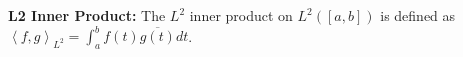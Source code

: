 {\bf L2 Inner Product:} The $L^2$ inner product on $L^2([a,b])$ is defined as\newline $\left\langle f,g\right\rangle_{L^2}=\int_a^bf(t)\overline{g(t)}dt$.
